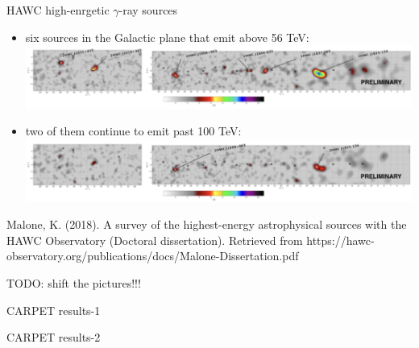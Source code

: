 \begin{frame}{HAWC high-enrgetic $\gamma$-ray sources}

\begin{itemize}
  \item six sources in the Galactic plane that emit above 56 TeV:
  \includegraphics[width=1\textwidth]{pics/HWC_above_56Tev.pdf}
  \item two of them continue to emit past 100 TeV:
  \includegraphics[width=1\textwidth]{pics/HWC_above_100Tev.pdf}
\end{itemize}

Malone, K. (2018). A survey of the highest-energy astrophysical sources with the HAWC Observatory (Doctoral dissertation). 
Retrieved from https://hawc-observatory.org/publications/docs/Malone-Dissertation.pdf

TODO: shift the pictures!!!

\end{frame}

\begin{frame}{CARPET results-1}
 
\end{frame}

\begin{frame}{CARPET results-2}
 
\end{frame}
